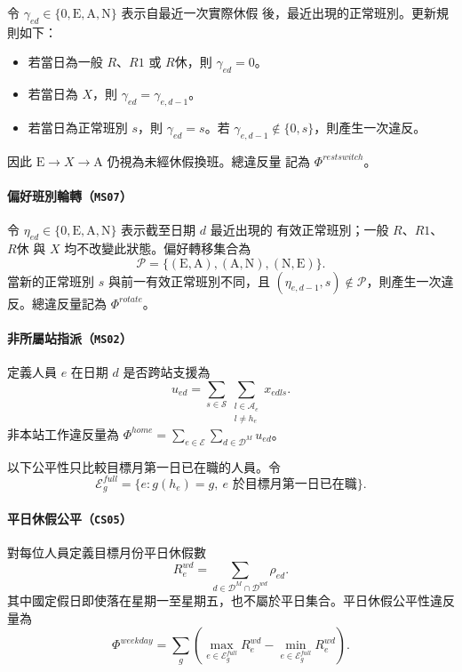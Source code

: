 \documentclass[12pt]{article}
\begin{document}
令 \(\gamma_{ed}\in\{0,\mathrm{E},\mathrm{A},\mathrm{N}\}\) 表示自最近一次實際休假
後，最近出現的正常班別。更新規則如下：

\begin{itemize}
  \item 若當日為一般 \(R\)、\(R1\) 或 \(R休\)，則 \(\gamma_{ed}=0\)。
  \item 若當日為 \(X\)，則 \(\gamma_{ed}=\gamma_{e,d-1}\)。
  \item 若當日為正常班別 \(s\)，則 \(\gamma_{ed}=s\)。若
    \(\gamma_{e,d-1}\notin\{0,s\}\)，則產生一次違反。
\end{itemize}

因此 \(\mathrm{E}\rightarrow X\rightarrow\mathrm{A}\) 仍視為未經休假換班。總違反量
記為 \(\Phi^{restswitch}\)。

\paragraph{偏好班別輪轉（\texttt{MS07}）}

令 \(\eta_{ed}\in\{0,\mathrm{E},\mathrm{A},\mathrm{N}\}\) 表示截至日期 \(d\) 最近出現的
有效正常班別；一般 \(R\)、\(R1\)、\(R休\) 與 \(X\) 均不改變此狀態。偏好轉移集合為
\[
  \mathcal{P}
  =
  \{(\mathrm{E},\mathrm{A}),(\mathrm{A},\mathrm{N}),(\mathrm{N},\mathrm{E})\}.
\]
當新的正常班別 \(s\) 與前一有效正常班別不同，且
\((\eta_{e,d-1},s)\notin\mathcal{P}\)，則產生一次違反。總違反量記為
\(\Phi^{rotate}\)。

\paragraph{非所屬站指派（\texttt{MS02}）}

定義人員 \(e\) 在日期 \(d\) 是否跨站支援為
\[
  u_{ed}
  =
  \sum_{s\in\mathcal{S}}
  \sum_{\substack{l\in\mathcal{A}_e\\l\neq h_e}}x_{edls}.
\]
非本站工作違反量為
\(\Phi^{home}=\sum_{e\in\mathcal{E}}\sum_{d\in\mathcal{D}^{M}}u_{ed}\)。

以下公平性只比較目標月第一日已在職的人員。令
\[
  \mathcal E^{full}_g=\{e:g(h_e)=g,\ e\text{ 於目標月第一日已在職}\}.
\]

\paragraph{平日休假公平（\texttt{CS05}）}

對每位人員定義目標月份平日休假數
\[
  R^{wd}_{e}
  =
  \sum_{d\in\mathcal{D}^{M}\cap\mathcal{D}^{wd}}\rho_{ed}.
\]
其中國定假日即使落在星期一至星期五，也不屬於平日集合。平日休假公平性違反量為
\[
  \Phi^{weekday}
  =
  \sum_g
  \left(
    \max_{e\in\mathcal E^{full}_g}R^{wd}_{e}
    -
    \min_{e\in\mathcal E^{full}_g}R^{wd}_{e}
  \right).
\]
\end{document}

